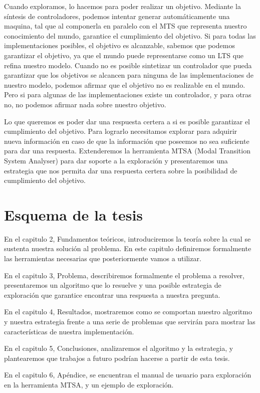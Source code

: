 \vspace{\baselineskip}
Cuando exploramos, lo hacemos para poder realizar un objetivo. Mediante la síntesis de controladores, podemos intentar 
generar automáticamente una maquina, tal que al componerla en paralelo con el MTS que representa nuestro conocimiento 
del mundo, garantice el cumplimiento del objetivo.
Si para todas las implementaciones posibles, el objetivo es alcanzable, sabemos que podemos garantizar el objetivo, ya 
que el mundo puede representarse como un LTS que refina nuestro modelo.
Cuando no es posible sintetizar un controlador que pueda garantizar que los objetivos se alcancen para ninguna de las
implementaciones de nuestro modelo, podemos afirmar que el objetivo no es realizable en el mundo. Pero si para algunas 
de las implementaciones existe un controlador, y para otras no, no podemos afirmar nada sobre nuestro objetivo.

\vspace{\baselineskip}
Lo que queremos es poder dar una respuesta certera a si es posible garantizar el cumplimiento del objetivo.
Para lograrlo necesitamos explorar para adquirir nueva información en caso de que la información que poseemos no sea
suficiente para dar una respuesta. Extenderemos la herramienta MTSA (Modal Transition System Analyser) para dar soporte
a la exploración y presentaremos una estrategia que nos permita dar una respuesta certera sobre la posibilidad de 
cumplimiento del objetivo.

\section{Esquema de la tesis}

En el capitulo 2, Fundamentos teóricos, introduciremos la teoría sobre la cual se sustenta nuestra solución al problema.
En este capitulo definiremos formalmente las herramientas necesarias que posteriormente vamos a utilizar.

\vspace{\baselineskip}
En el capitulo 3, Problema, describiremos formalmente el problema a resolver, presentaremos un algoritmo que lo resuelve
y una posible estrategia de exploración que garantice encontrar una respuesta a nuestra pregunta.

\vspace{\baselineskip}
En el capitulo 4, Resultados, mostraremos como se comportan nuestro algoritmo y nuestra estrategia frente a una serie
de problemas que servirán para mostrar las características de nuestra implementación.

\vspace{\baselineskip}
En el capitulo 5, Conclusiones, analizaremos el algoritmo y la estrategia, y plantearemos que trabajos a futuro podrían
hacerse a partir de esta tesis. 

\vspace{\baselineskip}
En el capitulo 6, Apéndice, se encuentran el manual de usuario para exploración en la herramienta MTSA, y un ejemplo de exploración.
